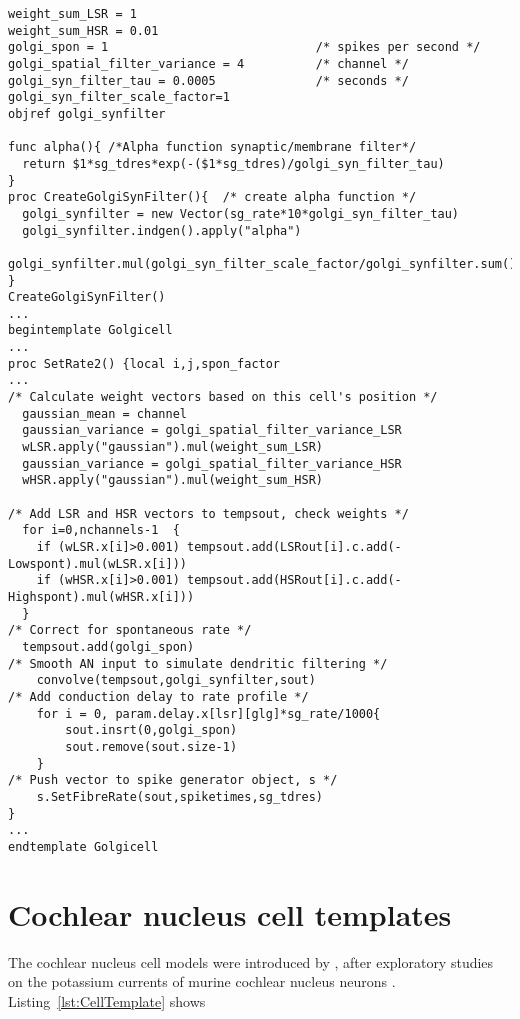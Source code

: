 \begin{lstlisting}[label=GolgiTemplate,caption=Create golgi cell rate vector within Golgi template (in CNcell.tem)]
weight_sum_LSR = 1
weight_sum_HSR = 0.01
golgi_spon = 1                             /* spikes per second */
golgi_spatial_filter_variance = 4          /* channel */
golgi_syn_filter_tau = 0.0005              /* seconds */
golgi_syn_filter_scale_factor=1
objref golgi_synfilter

func alpha(){ /*Alpha function synaptic/membrane filter*/
  return $1*sg_tdres*exp(-($1*sg_tdres)/golgi_syn_filter_tau)
}
proc CreateGolgiSynFilter(){  /* create alpha function */
  golgi_synfilter = new Vector(sg_rate*10*golgi_syn_filter_tau)
  golgi_synfilter.indgen().apply("alpha")  
  golgi_synfilter.mul(golgi_syn_filter_scale_factor/golgi_synfilter.sum()) 
}
CreateGolgiSynFilter()
...
begintemplate Golgicell
...
proc SetRate2() {local i,j,spon_factor
...
/* Calculate weight vectors based on this cell's position */
  gaussian_mean = channel
  gaussian_variance = golgi_spatial_filter_variance_LSR
  wLSR.apply("gaussian").mul(weight_sum_LSR)
  gaussian_variance = golgi_spatial_filter_variance_HSR
  wHSR.apply("gaussian").mul(weight_sum_HSR)

/* Add LSR and HSR vectors to tempsout, check weights */
  for i=0,nchannels-1  {
    if (wLSR.x[i]>0.001) tempsout.add(LSRout[i].c.add(-Lowspont).mul(wLSR.x[i]))
    if (wHSR.x[i]>0.001) tempsout.add(HSRout[i].c.add(-Highspont).mul(wHSR.x[i]))
  }
/* Correct for spontaneous rate */
  tempsout.add(golgi_spon)
/* Smooth AN input to simulate dendritic filtering */
    convolve(tempsout,golgi_synfilter,sout)
/* Add conduction delay to rate profile */
    for i = 0, param.delay.x[lsr][glg]*sg_rate/1000{
        sout.insrt(0,golgi_spon)
        sout.remove(sout.size-1)
    }
/* Push vector to spike generator object, s */
    s.SetFibreRate(sout,spiketimes,sg_tdres)
}
...
endtemplate Golgicell
\end{lstlisting}


\section{Cochlear nucleus cell templates}

The cochlear nucleus cell models were introduced by \citet{RothmanManis:2003b}, after exploratory studies on the potassium currents of murine cochlear nucleus neurons \citep{RothmanManis:2003,RothmanManis:2003a}. Listing~\ref{lst:CellTemplate}  shows 


